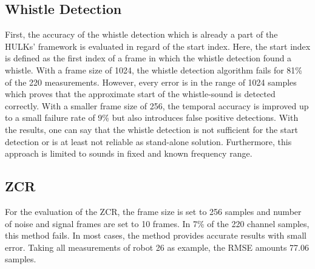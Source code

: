 \subsection{Whistle Detection}
\label{subsec:04_whistleDetection}

First, the accuracy of the whistle detection which is already a part of the HULKs' framework
is evaluated in regard of the start index.
Here, the start index is defined as the first index of a frame in which the whistle detection
found a whistle.
With a frame size of 1024, the whistle detection algorithm fails for 81\si{\percent}
of the 220 measurements.
However, every error is in the range of 1024 samples which proves that the
approximate start of the whistle-sound is detected correctly.
With a smaller frame size of 256, the temporal accuracy is improved up to a small
failure rate of 9\si{\percent} but also introduces false positive detections.
With the results, one can say that the whistle detection is not sufficient
for the start detection or is at least not reliable as stand-alone solution.
Furthermore, this approach is limited to sounds in fixed and known frequency range.


\subsection{ZCR}
\label{subsec:04_zcr}

For the evaluation of the \ac{ZCR},
the frame size is set to 256 samples and number of noise and signal frames
are set to 10 frames.
In 7\si{\percent} of the 220 channel samples, this method fails.
In most cases, the method provides accurate results with
small error. Taking all measurements of robot 26 as example, the \ac{RMSE}
amounts 77.06 samples.

